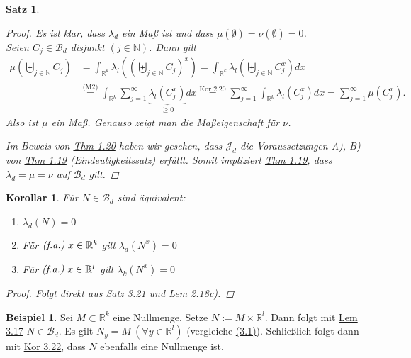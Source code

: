 \documentclass[a4paper]{report}
\newcommand{\R}{\mathbb{R}}
\newcommand{\N}{\mathbb{N}}
\newcommand{\Borel}{\mathcal{B}}
\newcommand{\Bd}{\Borel_d}
\newcommand{\Jd}{\mathcal{J}_d}
\newcommand{\bigdcup}{\biguplus}
\newcommand{\jlabel}[1]{\label{j_#1}}
\newcommand{\jshortlink}[1]{\jhyperref{#1}{\text{#1}}}
\newcommand{\jhyperref}[2]{\hyperref[j_#1]{#2}}
\newcommand{\jlink}[1]{\jhyperref{#1}{#1}}
\newcommand{\fa}{\text{\textit{(f.a.)}}}
\newcommand{\jspacesmall}{\vspace{4pt}}
\theoremstyle{plain}
\newtheorem{satz}[thm]{Satz}
\newtheorem{kor}[thm]{Korollar}
\theoremstyle{definition}
\newtheorem*{expl*}{Beispiel}
\begin{document}
{{{{\begin{satz}
\begin{proof}
        Es ist klar, dass $\lambda_d$ ein Maß ist und dass $\mu(\emptyset) = \nu(\emptyset) = 0$.\\
        Seien $C_j\in \Bd$ disjunkt $(j\in\N)$. Dann gilt
        \begin{displaymath}
            \begin{split}
                \mu\left( \bigdcup_{j\in\N} C_j \right) &= \int_{\R^k} \lambda_l \left (\left( \bigdcup_{j\in\N} C_j \right)^x \right) = \int_{\R^k} \lambda_l \left(\bigdcup_{j\in\N} C_j^x \right )dx\\
                &\overset{\text{(M2)}}{=} \int_{\R^k} \sum_{j=1}^\infty \underbrace{\lambda_l(C_j^x)}_{\ge 0}dx \overset{\jshortlink{Kor 2.20}}{=} \sum_{j=1}^\infty \int_{\R^k} \lambda_l(C_j^x)dx = \sum_{j=1}^\infty \mu(C_j^x).
            \end{split}
        \end{displaymath}
        Also ist $\mu$ ein Maß. Genauso zeigt man die Maßeigenschaft für $\nu$.
        
        \jspacesmall
        
        Im Beweis von \jlink{Thm 1.20} haben wir gesehen, dass $\Jd$ die Voraussetzungen A), B) von \jlink{Thm 1.19} (Eindeutigkeitssatz) erfüllt. Somit impliziert \jlink{Thm 1.19}, dass $\lambda_d = \mu = \nu$ auf $\Bd$ gilt.
        
    \end{proof}
\end{satz}

\begin{kor}
\jlabel{Kor 3.22}
    Für $N\in\Bd$ sind äquivalent:
    \begin{enumerate}
        \item $\lambda_d(N)=0$
        \item Für $\fa \ x\in\R^k$ gilt $\lambda_d(N^x) = 0$
        \item Für $\fa \ x\in\R^l$ gilt $\lambda_k(N^x) = 0$
    \end{enumerate}
    \begin{proof}
        Folgt direkt aus \jlink{Satz 3.21} und \jlink{Lem 2.18}c).
    \end{proof}
\end{kor}


\begin{expl*}
    Sei $M\subset \R^k$ eine Nullmenge. Setze $N:=M\times \R^l$. Dann folgt mit \jlink{Lem 3.17} $N\in \Bd$. Es gilt $N_y = M \ (\forall y\in \R^l)$ (vergleiche \jlink{(3.1)}). Schließlich folgt dann mit \jlink{Kor 3.22}, dass $N$ ebenfalls eine Nullmenge ist.
\end{expl*}


}}}}
\end{document}
